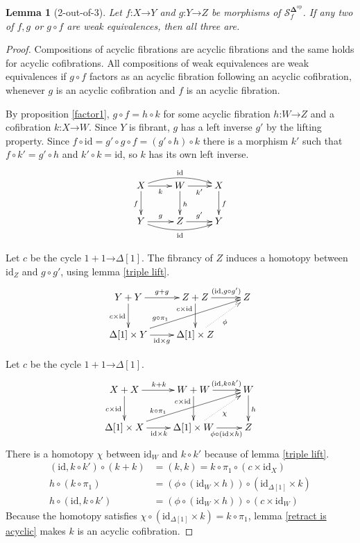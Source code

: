 \documentclass{amsart}
\theoremstyle{plain}
\newtheorem{lemma}[theorem]{Lemma}
\theoremstyle{definition}
\newcommand\cat\mathcal
\newcommand\id{\mathrm{id}}
\newcommand\dual{^{\mathrm{op}}}
\newcommand\simCat{\mathbf\Delta}
\newcommand\s{^{\simCat\dual}}
\newcommand\of{\mathord:}
\renewcommand\to{\mathord\rightarrow}
\newcommand\simplex\Delta
\newcommand\f{_f}
\begin{document}
\begin{lemma}[2-out-of-3] Let $f\of X\to Y$ and $g\of Y\to Z$ be morphisms of $\cat S\s\f$. If any two of $f,g$ or $g\circ f$ are weak equivalences, then all three are. \label{toot}\end{lemma}

\begin{proof}
Compositions of acyclic fibrations are acyclic fibrations and the same holds for acyclic cofibrations. All compositions of weak equivalences are weak equivalences if $g\circ f$ factors as an acyclic fibration following an acyclic cofibration, whenever $g$ is an acyclic cofibration and $f$ is an acyclic fibration.

By proposition \ref{factor1}, $g\circ f=h\circ k$ for some acyclic fibration $h\of W\to Z$ and a cofibration $k\of X\to W$. Since $Y$ is fibrant, $g$ has a left inverse $g'$ by the lifting property. Since $f \circ \id = g'\circ g\circ f= (g'\circ h)\circ k$ there is a morphism $k'$ such that $f\circ k' = g'\circ h$ and $k'\circ k = \id$, so $k$ has its own left inverse.
\[\xymatrix{
X\ar[d]_f \ar[r]_{k} \ar@/^2ex/[rr]^{\id} & W\ar[d]^h \ar[r]_{k'} & X\ar[d]^f\\
Y \ar[r]^{g} \ar@/_2ex/[rr]_{\id} & Z \ar[r]^{g'} & Y
}\]

Let $c$ be the cycle $1+1\to\simplex[1]$. The fibrancy of $Z$ induces a homotopy between $\id_Z$ and $g\circ g'$, using lemma \ref{triple lift}.
\[\xymatrix{
Y+Y\ar[r]^{g+g}\ar[d]_{c\times\id} & Z+Z\ar[r]^(.6){(\id,g\circ g')}\ar[d]_(.3){c\times\id} & Z\\
\simplex[1]\times Y\ar[r]_{\id\times g}\ar[urr]^(.3){g\circ\pi_1} & \simplex[1]\times Z\ar@{.>}[ur]_{\phi}
}\]

Let $c$ be the cycle $1+1\to\simplex[1]$. 
\[\xymatrix{
X+X\ar[d]_{c\times \id}\ar[r]^{k+k} & W+W\ar[d]_(.3){c\times \id}\ar[r]^(.6){(\id,k\circ k')} & W\ar[d]^h\\
\simplex[1]\times X\ar[r]_{\id\times k} \ar[urr]^(.3){k\circ \pi_1}  & \simplex[1]\times W\ar[r]_(.6){\phi\circ (\id\times h)} \ar@{.>}[ur]_\chi & Z
}\]
There is a homotopy $\chi$ between $\id_W$ and $k\circ k'$ because of lemma \ref{triple lift}.
\begin{align*}
(\id, k\circ k')\circ (k+k) &= (k,k) = k\circ \pi_1\circ(c\times\id_X)\\
h\circ (k \circ \pi_1) &= (\phi\circ (\id_W\times h))\circ (\id_{\simplex[1]} \times k)\\
h\circ (\id, k\circ k') &= (\phi\circ (\id_W\times h))\circ (c\times \id_W)
\end{align*}
Because the homotopy satisfies $\chi\circ(\id_{\simplex[1]}\times k) = k\circ \pi_1$, lemma \ref{retract is acyclic} makes $k$ is an acyclic cofibration.


\end{proof}
\end{document}
